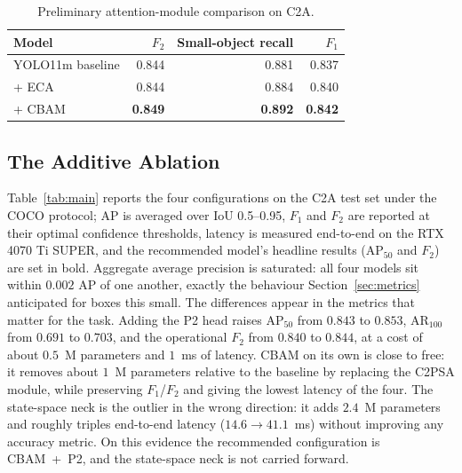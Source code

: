 \begin{table}[tbp]
  \centering
  \caption{Preliminary attention-module comparison on C2A.}
  \label{tab:eca}
  \begin{tabular}{@{}l r r r@{}}
    \toprule
    Model & $F_2$ & Small-object recall & $F_1$ \\
    \midrule
    YOLO11m baseline & 0.844 & 0.881 & 0.837 \\
    + ECA            & 0.844 & 0.884 & 0.840 \\
    + CBAM           & \textbf{0.849} & \textbf{0.892} & \textbf{0.842} \\
    \bottomrule
  \end{tabular}
\end{table}

\subsection{The Additive Ablation}
Table~\ref{tab:main} reports the four configurations on the C2A test set
under the COCO protocol; AP is averaged over IoU 0.5--0.95, $F_1$ and $F_2$
are reported at their optimal confidence thresholds, latency is measured
end-to-end on the RTX 4070 Ti SUPER, and the recommended model's headline
results ($\mathrm{AP}_{50}$ and $F_2$) are set in bold. Aggregate average
precision is saturated: all
four models sit within $0.002$ AP of one another, exactly the behaviour
Section~\ref{sec:metrics} anticipated for boxes this small. The differences
appear in the metrics that matter for the task. Adding the P2 head raises
$\mathrm{AP}_{50}$ from $0.843$ to $0.853$, $\mathrm{AR}_{100}$ from $0.691$
to $0.703$, and the operational $F_2$ from $0.840$ to $0.844$, at a cost of
about $0.5$~M parameters and $1$~ms of latency. CBAM on its own is close to
free: it removes about $1$~M parameters relative to the baseline by replacing
the C2PSA module, while preserving $F_1$/$F_2$ and giving the lowest latency
of the four. The state-space neck
is the outlier in the wrong direction: it adds $2.4$~M parameters and
roughly triples end-to-end latency ($14.6 \to 41.1$~ms) without improving
any accuracy metric. On this evidence the recommended configuration is
CBAM~+~P2, and the state-space neck is not carried forward.

